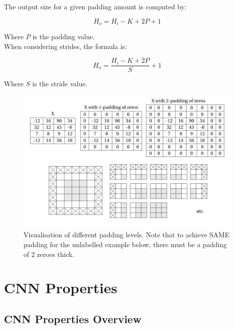 The output size for a given padding amount is computed by:

\[
H_o = H_i - K + 2P + 1
\]

Where \(P\) is the padding value.\\

When considering strides, the formula is:

\[
H_o = \frac{H_i - K + 2P}{S} + 1
\]

Where \(S\) is the stride value.

\begin{figure}[H]
    \centering
    \includegraphics[width=0.75\linewidth]{img/padding.png}
    \caption{Visualisation of different padding levels. Note that to achieve SAME padding for the unlabelled example below, there must be a padding of 2 zeroes thick.}
    
\end{figure}

\section{CNN Properties}
\subsection{CNN Properties Overview}

